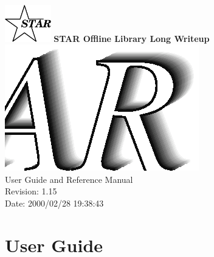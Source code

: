 \documentclass[twoside]{article}
\begin{document}
%
%
\begin{titlepage}
\pagestyle{empty}
\vspace*{-35mm}
\begin{center}
  \mbox{\includegraphics[width=2cm]{StarIcon.eps}}
  {\Large\bf STAR Offline Library Long Writeup}
  \hfill\mbox{}\\[3cm]
  \mbox{\includegraphics[width=\textwidth]{StarClassLibraryTitle.eps}}
  \hfill\mbox{}\\[3cm]
  {\LARGE User Guide and Reference Manual}\\[2cm]
  {\LARGE $ $Revision: 1.15 $ $}  \\[5mm] %
  {\LARGE $ $Date: 2000/02/28 19:38:43 $ $}  %
  \vfill
\end{center}
\cleardoublepage
\end{titlepage}

%
%
\tableofcontents
\cleardoublepage

%
%
\part{User Guide}
\clearpage
\end{document}
